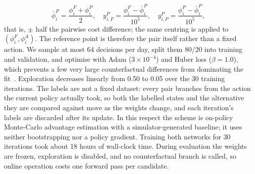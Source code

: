 \documentclass[a4paper]{llncs}
\begin{document}
\begin{equation}
\bar\phi_i^P=\frac{\phi_i^F+\phi_i^P}{2},\quad
y_{i,F}^P=\frac{\phi_i^F-\bar\phi_i^P}{10^5},\quad
y_{i,P}^P=\frac{\phi_i^P-\bar\phi_i^P}{10^5},
\end{equation}
that is, $\pm$ half the pairwise cost difference; the same centring is
applied to $(\phi_i^F,\phi_i^A)$. The reference point is therefore the
pair itself rather than a fixed action.
We sample at most 64 decisions per day, split them 80/20 into training
and validation, and optimise with Adam ($3\times10^{-4}$) and Huber loss
($\beta=1.0$), which prevents a few very large counterfactual
differences from dominating the fit~\cite{refhuber}. Exploration
decreases linearly from 0.50 to 0.05 over the 30 training iterations.
The labels are not a fixed dataset: every pair branches from the action
the current policy actually took, so both the labelled states and the
alternative they are compared against move as the weights change, and
each iteration's labels are discarded after its update. In this respect
the scheme is on-policy Monte-Carlo advantage estimation with a
simulator-generated baseline; it uses neither bootstrapping nor a policy
gradient. Training both networks for 30 iterations took about 18 hours
of wall-clock time. During evaluation the weights are frozen,
exploration is disabled, and no counterfactual branch is called, so
online operation costs one forward pass per candidate.

\end{document}
